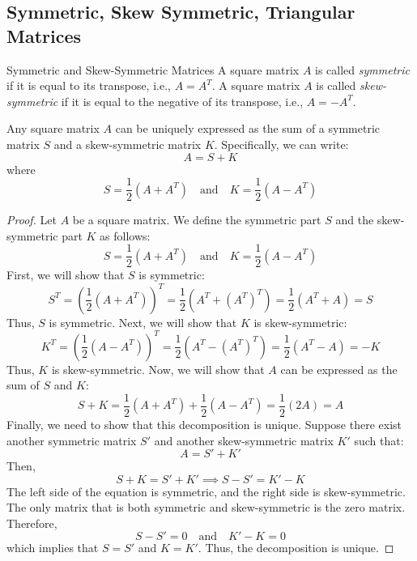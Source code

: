 \documentclass[openany]{book}
\begin{document}
\subsection{Symmetric, Skew Symmetric, Triangular Matrices}
\begin{mydefinition}{Symmetric and Skew-Symmetric Matrices}
A square matrix $A$ is called \emph{symmetric} if it is equal to its transpose, i.e., $A = A^T$. A square matrix $A$ is called \emph{skew-symmetric} if it is equal to the negative of its transpose, i.e., $A = -A^T$.
\end{mydefinition}
\begin{mytheorem}
Any square matrix $A$ can be uniquely expressed as the sum of a symmetric matrix $S$ and a skew-symmetric matrix $K$. Specifically, we can write:
\[A = S + K\]
where
\[S = \frac{1}{2}(A + A^T) \quad \text{and} \quad K = \frac{1}{2}(A - A^T)\]
\end{mytheorem}
\begin{proof}
    Let $A$ be a square matrix. We define the symmetric part $S$ and the skew-symmetric part $K$ as follows:
    \[
    S = \frac{1}{2}(A + A^T) \quad \text{and} \quad K = \frac{1}{2}(A - A^T)
    \]
    First, we will show that $S$ is symmetric:
    \[
    S^T = \left(\frac{1}{2}(A + A^T)\right)^T = \frac{1}{2}(A^T + (A^T)^T) = \frac{1}{2}(A^T + A) = S
    \]
    Thus, $S$ is symmetric. Next, we will show that $K$ is skew-symmetric:
    \[
    K^T = \left(\frac{1}{2}(A - A^T)\right)^T = \frac{1}{2}(A^T - (A^T)^T) = \frac{1}{2}(A^T - A) = -K
    \]
    Thus, $K$ is skew-symmetric. Now, we will show that $A$ can be expressed as the sum of $S$ and $K$:
    \[
    S + K = \frac{1}{2}(A + A^T) + \frac{1}{2}(A - A^T) = \frac{1}{2}(2A) = A
    \]
    Finally, we need to show that this decomposition is unique. Suppose there exist another symmetric matrix $S'$ and another skew-symmetric matrix $K'$ such that:
    \[
    A = S' + K'
    \]
    Then,
    \[
    S + K = S' + K' \implies S - S' = K' - K
    \]
    The left side of the equation is symmetric, and the right side is skew-symmetric. The only matrix that is both symmetric and skew-symmetric is the zero matrix. Therefore,
    \[
    S - S' = 0 \quad \text{and} \quad K' - K = 0
    \]
    which implies that $S = S'$ and $K = K'$. Thus, the decomposition is unique.
\end{proof}
\end{document}
